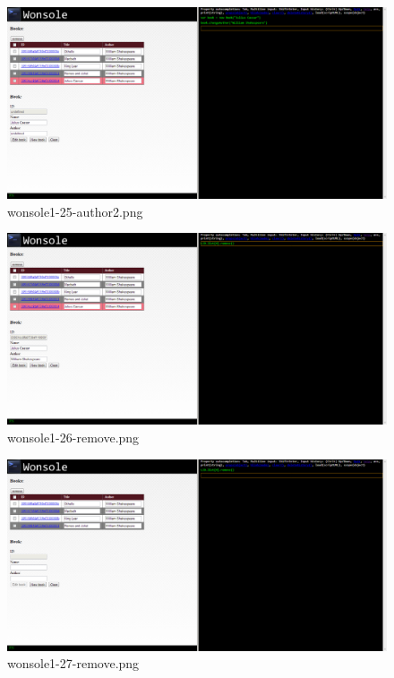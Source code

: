 \clearpage
\begin{figure}
\includegraphics[width=\textwidth]{screenshot/wonsole1-25-author2.png}
\caption{wonsole1-25-author2.png}
\label{wonsole1-25-author2.png}
\end{figure}


\begin{figure}
\includegraphics[width=\textwidth]{screenshot/wonsole1-26-remove.png}
\caption{wonsole1-26-remove.png}
\label{wonsole1-26-remove.png}
\end{figure}


\clearpage
\begin{figure}
\includegraphics[width=\textwidth]{screenshot/wonsole1-27-remove.png}
\caption{wonsole1-27-remove.png}
\label{wonsole1-27-remove.png}
\end{figure}


